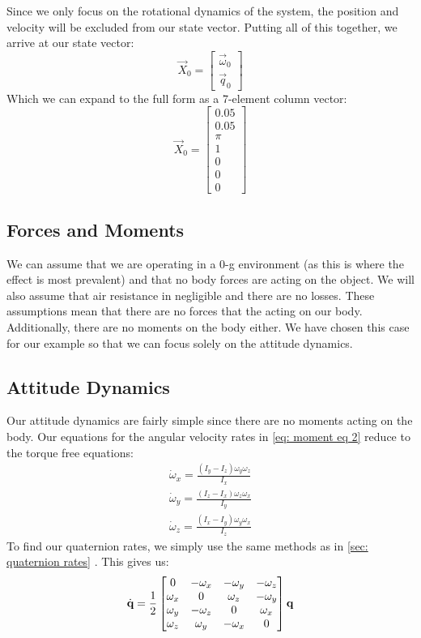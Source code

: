 \documentclass[10pt, openany, titlepage]{book}
\theoremstyle{definition}
\newcounter{example}[chapter]
\let\oldautoref\autoref
\renewcommand{\autoref}[1]{%
  \begingroup
  \hypersetup{linkcolor=black}%
  \oldautoref{#1}%
  \endgroup
}
\begin{document}
Since we only focus on the rotational dynamics of the system, the position and velocity will be excluded from our state vector. Putting all of this together, we arrive at our \gls{state vector}:
$$\vec{X}_0=\begin{bmatrix}
    \vec{\omega}_0\\\vec{q}_0
\end{bmatrix}$$
Which we can expand to the full form as a 7-element column vector:
$$\vec{X}_0=\begin{bmatrix}
    0.05\\0.05\\\pi\\1\\0\\0\\0
\end{bmatrix}$$
\subsection{Forces and Moments}
We can assume that we are operating in a 0-g environment (as this is where the effect is most prevalent) and that no body forces are acting on the object. We will also assume that air resistance in negligible and there are no losses. These assumptions mean that there are no forces that the acting on our body. Additionally, there are no moments on the body either. We have chosen this case for our example so that we can focus solely on the attitude dynamics.
\subsection{Attitude Dynamics}
Our attitude dynamics are fairly simple since there are no moments acting on the body. Our equations for the angular velocity rates in \eqref{eq: moment eq 2} reduce to the torque free equations:
\begin{gather}\label{eq: moment eq dzhan}
    \dot{\omega}_x=\frac{\left(I_y-I_z\right)\omega_y\omega_z}{I_x}\\
    \dot{\omega}_y=\frac{\left(I_z-I_x\right)\omega_z\omega_x}{I_y}\\
    \dot{\omega}_z=\frac{\left(I_x-I_y\right)\omega_y\omega_x}{I_z}
\end{gather}
To find our \gls{quaternion} rates, we simply use the same methods as in \autoref{sec: quaternion rates}. This gives us:
\begin{gather}
{\color{black}\dot{\textbf{q}}=\frac{1}{2}\begin{bmatrix}
        0&-\omega_x&-\omega_y&-\omega_z\\
        \omega_x&0&\omega_z&-\omega_y\\
        \omega_y&-\omega_z&0&\omega_x\\
        \omega_z&\omega_y&-\omega_x&0
    \end{bmatrix}\mathbf{q}}
\end{gather}
\end{document}

